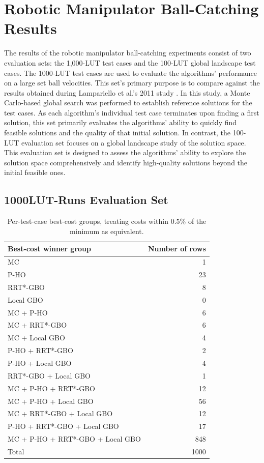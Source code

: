 \section{Robotic Manipulator Ball-Catching Results}
\label{sec:results_manipulator}

The results of the robotic manipulator ball-catching experiments consist of two 
evaluation sets: the 1,000-\ac{LUT} test cases and the 100-\ac{LUT} global landscape 
test cases. 
The 1000-\ac{LUT} test cases are used to evaluate the algorithms' 
performance on a large set ball velocities. 
This set's primary purpose is to compare against the results obtained during 
Lampariello et al.'s 2011 study \cite{Lampariello2011}.
In this study, a Monte Carlo-based global search was performed to establish 
reference solutions for the test cases.
As each algorithm's individual test case terminates upon finding a first solution, this
set primarily evaluates the algorithms' ability to quickly find feasible solutions and 
the quality of that initial solution.
In contrast, the 100-\ac{LUT} evaluation set focuses on a global landscape study of the
solution space. 
This evaluation set is designed to assess the algorithms' ability to explore the solution 
space comprehensively and identify high-quality solutions beyond the initial feasible ones.

\subsection{1000\ac{LUT}-Runs Evaluation Set}

\begin{table}[ht]
\centering
\caption{Per-test-case best-cost groups, treating costs within 0.5\% of the minimum as equivalent.}
\label{tab:best-cost-winner-groups}
\begin{tabular}{lr}
\hline
Best-cost winner group & Number of rows \\
\hline
MC & 1 \\
P-HO & 23 \\
RRT*-GBO & 8 \\
Local GBO & 0 \\
MC + P-HO & 6 \\
MC + RRT*-GBO & 6 \\
MC + Local GBO & 4 \\
P-HO + RRT*-GBO & 2 \\
P-HO + Local GBO & 4 \\
RRT*-GBO + Local GBO & 1 \\
MC + P-HO + RRT*-GBO & 12 \\
MC + P-HO + Local GBO & 56 \\
MC + RRT*-GBO + Local GBO & 12 \\
P-HO + RRT*-GBO + Local GBO & 17 \\
MC + P-HO + RRT*-GBO + Local GBO & 848 \\
\hline
Total & 1000 \\
\hline
\end{tabular}
\end{table}

